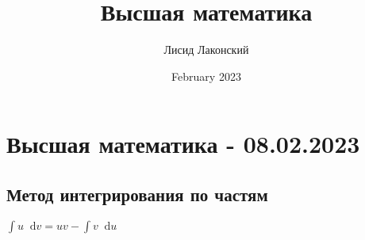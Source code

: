 \documentclass{article}
\title{Высшая математика}
\author{Лисид Лаконский}
\date{February 2023}
\newcommand*\diff{\mathop{}\!\mathrm{d}}
\begin{document}
\raggedright

\maketitle

\tableofcontents
\pagebreak

\section{Высшая математика - 08.02.2023}

\subsection{Метод интегрирования по частям}

$\int u \diff v = u v - \int v \diff u$
\end{document}
